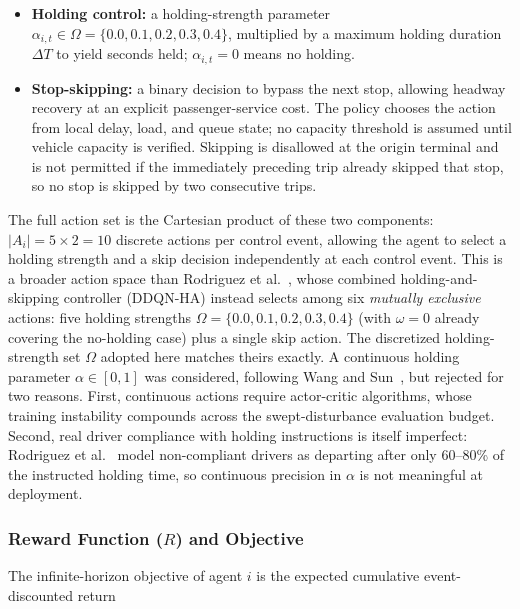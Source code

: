 \begin{itemize}
\item \textbf{Holding control:} a holding-strength parameter $\alpha_{i,t} \in \Omega = \{0.0, 0.1, 0.2, 0.3, 0.4\}$, multiplied by a maximum holding duration $\Delta T$ to yield seconds held; $\alpha_{i,t} = 0$ means no holding.
\item \textbf{Stop-skipping:} a binary decision to bypass the next stop, allowing headway recovery at an explicit passenger-service cost. The policy chooses the action from local delay, load, and queue state; no capacity threshold is assumed until vehicle capacity is verified. Skipping is disallowed at the origin terminal and is not permitted if the immediately preceding trip already skipped that stop, so no stop is skipped by two consecutive trips.
\end{itemize}

The full action set is the Cartesian product of these two components: $|A_i| = 5 \times 2 = 10$ discrete actions per control event, allowing the agent to select a holding strength and a skip decision independently at each control event. This is a broader action space than Rodriguez et al.~\cite{Rodriguez2023Cooperative}, whose combined holding-and-skipping controller (DDQN-HA) instead selects among six \textit{mutually exclusive} actions: five holding strengths $\Omega = \{0.0, 0.1, 0.2, 0.3, 0.4\}$ (with $\omega = 0$ already covering the no-holding case) plus a single skip action. The discretized holding-strength set $\Omega$ adopted here matches theirs exactly. A continuous holding parameter $\alpha \in [0, 1]$ was considered, following Wang and Sun~\cite{Wangsun}, but rejected for two reasons. First, continuous actions require actor-critic algorithms, whose training instability compounds across the swept-disturbance evaluation budget. Second, real driver compliance with holding instructions is itself imperfect: Rodriguez et al.~\cite{Rodriguez2023Cooperative} model non-compliant drivers as departing after only 60--80\% of the instructed holding time, so continuous precision in $\alpha$ is not meaningful at deployment.

\subsubsection{Reward Function ($R$) and Objective}
\label{subsec:reward}

The infinite-horizon objective of agent $i$ is the expected cumulative event-discounted return

